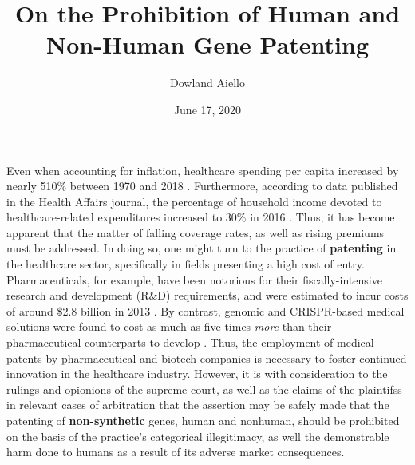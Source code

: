 \documentclass[12pt]{article}
\begin{document}
\title{On the Prohibition of Human and Non-Human Gene Patenting}
\author{Dowland Aiello}
\date{June 17, 2020}

\maketitle
\fancyhf{}

Even when accounting for inflation, healthcare spending per capita increased by
nearly 510\% between 1970 and 2018 \cite{healthcare_spending}. Furthermore,
according to data published in the Health Affairs journal, the percentage of
household income devoted to healthcare-related expenditures increased to 30\% in
2016 \cite{healthaffairs}. Thus, it has become apparent that the matter of
falling coverage rates, as well as rising premiums must be addressed. In doing
so, one might turn to the practice of \textbf{patenting} in the healthcare
sector, specifically in fields presenting a high cost of entry.
Pharmaceuticals, for example, have been notorious for their fiscally-intensive
research and development (R\&D) requirements, and were estimated to incur costs
of around \$2.8 billion in 2013 \cite{pharmaceutical_randd_costs}. By contrast,
genomic and CRISPR-based medical solutions were found to cost as much as five 
times \emph{more} than their pharmaceutical counterparts to
develop \cite{genetic_vs_traditional}. Thus, the employment of medical patents
by pharmaceutical and biotech companies is necessary to foster continued
innovation in the healthcare industry. However, it is with consideration to
the rulings and opionions of the supreme court, as well as the claims of the
plaintifss in relevant cases of arbitration that the assertion may be safely
made that the patenting of \textbf{non-synthetic} genes, human and nonhuman,
should be prohibited on the basis of the practice's categorical illegitimacy,
as well the demonstrable harm done to humans as a result of its adverse
market consequences.
\end{document}
